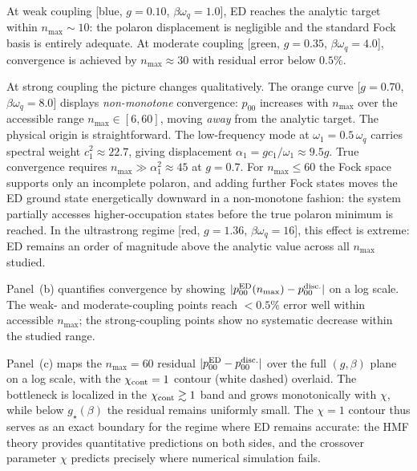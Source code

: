 At weak coupling [blue, $g=0.10$, $\beta\omega_q=1.0$], ED reaches the analytic
target within $n_{\max} \sim 10$: the polaron displacement is negligible and the
standard Fock basis is entirely adequate.  At moderate coupling [green,
$g=0.35$, $\beta\omega_q=4.0$], convergence is achieved by $n_{\max} \approx 30$
with residual error below $0.5\%$.

At strong coupling the picture changes qualitatively.  The orange curve
[$g=0.70$, $\beta\omega_q=8.0$] displays \emph{non-monotone} convergence: $p_{00}$
increases with $n_{\max}$ over the accessible range $n_{\max}\in[6,60]$, moving
\emph{away} from the analytic target.  The physical origin is straightforward.
The low-frequency mode at $\omega_1 = 0.5\,\omega_q$ carries spectral weight
$c_1^2 \approx 22.7$, giving displacement
$\alpha_1 = g c_1/\omega_1 \approx 9.5 g$.  True convergence requires
$n_{\max} \gg \alpha_1^2 \approx 45$ at $g = 0.7$.  For $n_{\max} \le 60$ the
Fock space supports only an incomplete polaron, and adding further Fock states
moves the ED ground state energetically downward in a non-monotone fashion: the
system partially accesses higher-occupation states before the true polaron
minimum is reached.  In the ultrastrong regime [red,
$g=1.36$, $\beta\omega_q=16$], this effect is extreme: ED remains an order of
magnitude above the analytic value across all $n_{\max}$ studied.

Panel~(b) quantifies convergence by showing $|p_{00}^{\rm ED}(n_{\max}) -
p_{00}^{\rm disc.}|$ on a log scale.  The weak- and moderate-coupling points
reach $<0.5\%$ error well within accessible $n_{\max}$; the strong-coupling
points show no systematic decrease within the studied range.

Panel~(c) maps the $n_{\max}=60$ residual $|p_{00}^{\rm ED} - p_{00}^{\rm
disc.}|$ over the full $(g,\beta)$ plane on a log scale, with the
$\chi_{\rm cont}=1$ contour (white dashed) overlaid.  The bottleneck is
localized in the $\chi_{\rm cont}\gtrsim 1$ band and grows monotonically with
$\chi$, while below $g_\star(\beta)$ the residual remains uniformly small.
The $\chi = 1$ contour thus serves as an exact boundary for the regime where
ED remains accurate: the HMF theory provides quantitative predictions on both
sides, and the crossover parameter $\chi$ predicts precisely where numerical
simulation fails.

